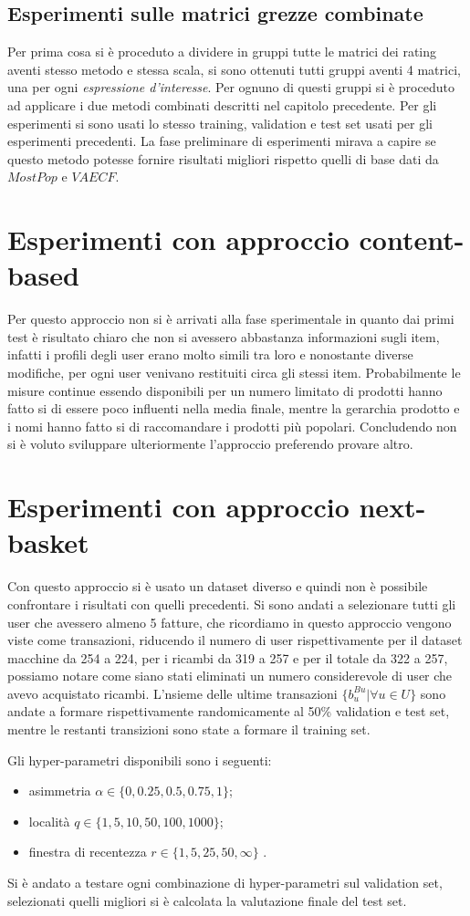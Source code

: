 \subsection{Esperimenti sulle matrici grezze combinate}
Per prima cosa si è proceduto a dividere in gruppi tutte le matrici dei rating aventi stesso metodo e stessa scala, si sono ottenuti tutti gruppi aventi 4 matrici, una per ogni \textit{espressione d'interesse}. Per ognuno di questi gruppi si è proceduto ad applicare i due metodi combinati descritti nel capitolo precedente. Per gli esperimenti si sono usati lo stesso training, validation e test set usati per gli esperimenti precedenti. La fase preliminare di esperimenti mirava a capire se questo metodo potesse fornire risultati migliori rispetto quelli di base dati da $MostPop$ e $VAECF$.

\section{Esperimenti con approccio content-based}
Per questo approccio non si è arrivati alla fase sperimentale in quanto dai primi test è risultato chiaro che non si avessero abbastanza informazioni sugli item, infatti i profili degli user erano molto simili tra loro e nonostante diverse modifiche, per ogni user venivano restituiti circa gli stessi item. Probabilmente le misure continue essendo disponibili per un numero limitato di prodotti hanno fatto si di essere poco influenti nella media finale, mentre la gerarchia prodotto e i nomi hanno fatto si di raccomandare i prodotti più popolari. Concludendo non si è voluto sviluppare ulteriormente l'approccio preferendo provare altro.

\section{Esperimenti con approccio next-basket}
Con questo approccio si è usato un dataset diverso e quindi non è possibile confrontare i risultati con quelli precedenti. Si sono andati a selezionare tutti gli user che avessero almeno 5 fatture, che ricordiamo in questo approccio vengono viste come transazioni, riducendo il numero di user rispettivamente per il dataset macchine da 254 a 224, per i ricambi da 319 a 257 e per il totale da 322 a 257, possiamo notare come siano stati eliminati un numero considerevole di user che avevo acquistato ricambi. L'nsieme delle ultime transazioni $\{b_{u}^{Bu}| \forall u \in U\}$ sono andate a formare rispettivamente randomicamente al 50\% validation e test set, mentre le restanti transizioni sono state a formare il training set. 

Gli hyper-parametri disponibili sono i seguenti:
\begin{itemize}
    \item asimmetria $\alpha \in \{0, 0.25, 0.5, 0.75, 1\}$;
    \item località $q \in \{1, 5, 10, 50, 100, 1000\}$;
    \item finestra di recentezza $r \in \{1, 5, 25, 50, \infty \}$ .
\end{itemize}

Si è andato a testare ogni combinazione di hyper-parametri sul validation set, selezionati quelli migliori si è calcolata la valutazione finale del test set.